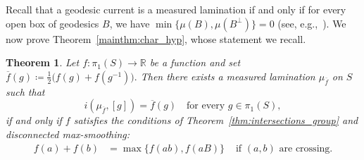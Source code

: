 \documentclass[11pt]{amsart}
\numberwithin{equation}{section}
\numberwithin{figure}{section}
\newtheorem{theorem}{Theorem}[section]
\theoremstyle{definition}
\theoremstyle{plain}
\begin{document}
Recall that a geodesic current is a measured lamination if and only if for every open box of geodesics $B$, we have $\min \{\mu(B),\mu(B^{\perp})\}=0$ (see, e.g.,~\cite[Proposition~2.1]{BIPP24:PositiveCrossratios}).
We now prove  Theorem~\ref{mainthm:char_hyp}, whose statement we recall.

\begin{theorem}
Let $f \colon \pi_1(S) \to \mathbb{R}$ be a function and set $\overline{f}(g) \coloneqq \frac{1}{2}\bigl(f(g)+f(g^{-1})\bigr).$
Then there exists a measured lamination
$\mu_{\overline f}$ on $S$ such that
\[
i(\mu_{\overline f},[g])=\overline f(g)
\quad\text{for every } g\in \pi_1(S),
\]
if and only if $f$ satisfies the conditions of
Theorem~\ref{thm:intersections_group}
and disconnected max-smoothing:
 \begin{align}
    \label{eq:disconn-max-smoothing-a} f(a) + f(b) &= \max \{ f(ab),f(aB) \}  & \mbox{ if }  (a,b)\mbox{ are } \mbox{crossing}.
  \end{align}
\end{theorem}
\end{document}
